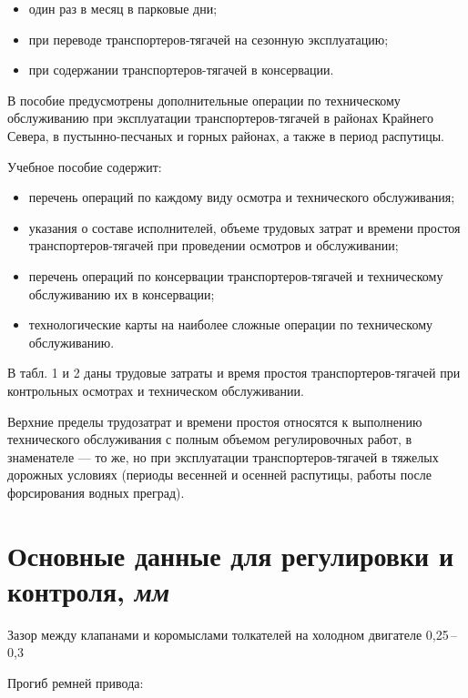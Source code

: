 \documentclass[12pt,a4paper,twoside,openright]{book}
\newcommand{\range}[2]{#1\,--\,#2}
\begin{document}
\begin{itemize}
    \item один раз в месяц в парковые дни;
    \item при переводе транспортеров-тягачей на сезонную эксплуатацию;
    \item при содержании транспортеров-тягачей в консервации.
\end{itemize}

В пособие предусмотрены дополнительные операции по техническому обслуживанию при эксплуатации транспортеров-тягачей в районах Крайнего Севера, в пустынно-песчаных и горных районах, а также в период распутицы.


Учебное пособие содержит:
\begin{itemize}
    \item перечень операций по каждому виду осмотра и технического обслуживания; 
    \item указания о составе исполнителей, объеме трудовых затрат и времени простоя транспортеров-тягачей при проведении осмотров и обслуживании;
    \item перечень операций по консервации транспортеров-тягачей и техническому обслуживанию их в консервации; 
    \item технологические карты на наиболее сложные операции по техническому обслуживанию.
\end{itemize}

В табл. 1 и 2 даны трудовые затраты и время простоя транспортеров-тягачей при контрольных осмотрах и техническом обслуживании. 

Верхние пределы трудозатрат и времени простоя относятся к выполнению технического обслуживания с полным объемом регулировочных работ, в знаменателе — то же, но при эксплуатации транспортеров-тягачей в тяжелых дорожных условиях (периоды весенней и осенней распутицы, работы после форсирования водных преград). 





\appendix

\chapter{Основные данные для регулировки и контроля, \textit{мм}}
\noindent
Зазор между клапанами и коромыслами толкателей на
холодном двигателе \dotfill \hspace*{1em} \range{0,25}{0,3}

\noindent
Прогиб ремней привода:
\end{document}
